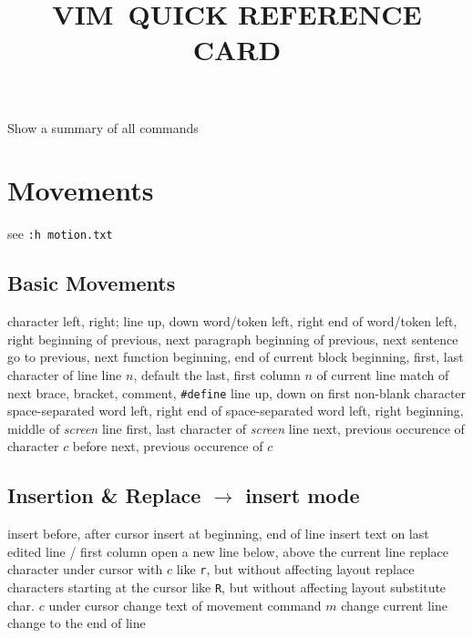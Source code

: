 
\def\content{VIM}
\def\versionnumber{1.4}  %
\def\version{v\versionnumber\ \month\ \year}




\title{\uppercase{\content\ quick reference card}}

\shortintro

\vskip 0.5cm
	{Show a summary of all commands }

\section{Movements}	{see {\tt :h motion.txt}}
\subsection{Basic Movements}{}
	{character left, right; line up, down }
	{word/token left, right }
	{end of word/token left, right}
\cmdS{\lapos\ \rapos }	{beginning of previous, next paragraph}
\cmdS{( ) }	{beginning of previous, next sentence}
\cmdS{[[\ ]]}	{go to previous, next function}
\cmdS{[\lapos\ ]\rapos}	{beginning, end of current block}
	{beginning, first, last character of line}
	{line $n$, default the last, first}
	{column $n$ of current line}
\cmdS{\% }	{match of next brace, bracket, comment, {\tt\#define}}
\cmdS{- + }	{line up, down on first non-blank character}
	{space-separated word left, right}
	{end of space-separated word left, right}
	{beginning, middle of {\it screen\/} line}
	{first, last character of {\it screen\/} line}
	{next, previous occurence of character $c$}
	{before next, previous occurence of $c$}

\subsection{Insertion \& Replace $\to$ insert mode}	{}
	{insert before, after cursor}
	{insert at beginning, end of line}
	{insert text on last edited line / first column}
	{open a new line below, above the current line}
	{replace character under cursor with $c$}
	{like {\tt r}, but without affecting layout}
	{replace characters starting at the cursor}
	{like {\tt R}, but without affecting layout}
	{substitute char. $c$ under cursor}
	{change text of movement command $m$}
	{change current line}
	{change to the end of line}

